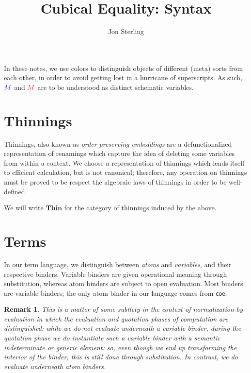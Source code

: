 \documentclass{article}
\title{Cubical Equality: Syntax}
\author{Jon Sterling}
\newtheorem{remark}{Remark}
\newcommand\FmtKwd[1]{\mathsf{#1}}
\newcommand\DeclBox[1]{\framebox{$\displaystyle{}#1$}}
\newcommand\FmtThin[1]{{\color{ProcessBlue}#1}}
\newcommand\Thin[2]{{#1}\rightarrowtriangle{#2}}
\newcommand\IsThin[3]{\FmtThin{#1}:\Thin{#2}{#3}}
\newcommand\ThinId{\mathsf{id}}
\newcommand\ThinKeep[1]{{#1}.\mathsf{c}}
\newcommand\ThinSkip[1]{{#1}.\mathsf{p}}
\newcommand\THIN{\mathbf{Thin}}
\newcommand\FmtTm[1]{{\color{Violet}#1}}
\newcommand\FmtVal[1]{{\color{Red}{#1}}}
\begin{document}
\maketitle

In these notes, we use colors to distinguish objects of different
(meta) sorts from each other, in order to avoid getting lost in a
hurricane of superscripts. As such, $\FmtTm{M}$ and $\FmtVal{M}$ are
to be understood as distinct schematic variables.

\section{Thinnings}

Thinnings, also known as \emph{order-preserving embeddings} are a
defunctionalized representation of renamings which capture the idea of
deleting some variables from within a context.
%
We choose a representation of thinnings which lends itself to
efficient calculation, but is not canonical; therefore, any operation
on thinnings must be proved to be respect the algebraic laws of
thinnings in order to be well-defined.

We will write $\THIN$ for the category of thinnings induced by the
above.

\section{Terms}


In our term language, we distinguish between \emph{atoms} and
\emph{variables}, and their respective binders. Variable binders are
given operational meaning through substitution, whereas atom binders
are subject to open evaluation. Most binders are variable binders; the
only atom binder in our language comes from $\FmtKwd{coe}$.

\begin{remark}
  This is a matter of some subtlety in the context of
  \emph{normalization-by-evaluation} in which the evaluation and
  quotation phases of computation are distinguished: while we do not
  evaluate underneath a variable binder, during the quotation phase we
  \emph{do} instantiate such a variable binder with a semantic
  indeterminate or generic element: so, even though we end up
  transforming the interior of the binder, this is still done through
  substitution. In contrast, we do evaluate underneath atom binders.
\end{remark}
\end{document}
